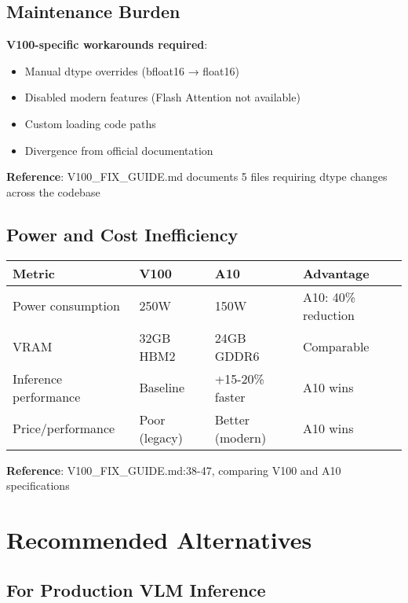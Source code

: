 \documentclass[11pt,a4paper]{article}
\begin{document}
\subsection{Maintenance Burden}

\textbf{V100-specific workarounds required}:
\begin{itemize}[leftmargin=*]
    \item Manual dtype overrides (bfloat16 → float16)
    \item Disabled modern features (Flash Attention not available)
    \item Custom loading code paths
    \item Divergence from official documentation
\end{itemize}

\textbf{Reference}: V100\_FIX\_GUIDE.md documents 5 files requiring dtype changes across the codebase

\subsection{Power and Cost Inefficiency}

\begin{table}[h]
\centering
\begin{tabular}{llll}
\toprule
\textbf{Metric} & \textbf{V100} & \textbf{A10} & \textbf{Advantage} \\
\midrule
Power consumption & 250W & 150W & A10: 40\% reduction \\
VRAM & 32GB HBM2 & 24GB GDDR6 & Comparable \\
Inference performance & Baseline & +15-20\% faster & A10 wins \\
Price/performance & Poor (legacy) & Better (modern) & A10 wins \\
\bottomrule
\end{tabular}
\end{table}

\textbf{Reference}: V100\_FIX\_GUIDE.md:38-47, comparing V100 and A10 specifications

\section{Recommended Alternatives}

\subsection{For Production VLM Inference}
\end{document}
